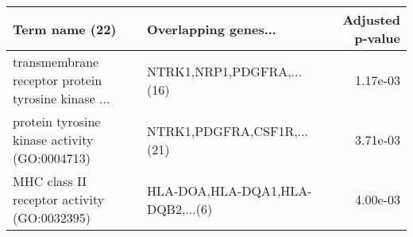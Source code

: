 \begin{tabular}{llr}
\toprule
                                    Term name (22) &             Overlapping genes... &  Adjusted p-value \\
\midrule
transmembrane receptor protein tyrosine kinase ... &        NTRK1,NRP1,PDGFRA,...(16) &          1.17e-03 \\
     protein tyrosine kinase activity (GO:0004713) &       NTRK1,PDGFRA,CSF1R,...(21) &          3.71e-03 \\
       MHC class II receptor activity (GO:0032395) & HLA-DOA,HLA-DQA1,HLA-DQB2,...(6) &          4.00e-03 \\
\bottomrule
\end{tabular}
